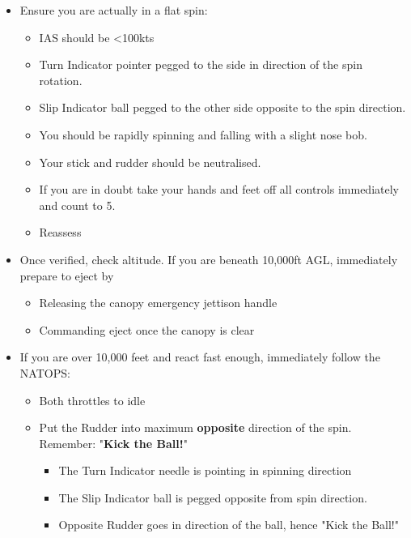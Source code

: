 \begin{itemize}

  \item Ensure you are actually in a flat spin:

  \begin{itemize}
    \item IAS should be <100kts
    \item Turn Indicator pointer pegged to the side in direction of the spin
      rotation.
    \item Slip Indicator ball pegged to the other side opposite to the spin
      direction.
    \item You should be rapidly spinning and falling with a slight nose bob.
    \item Your stick and rudder should be neutralised.
    \item If you are in doubt take your hands and feet off all controls
      immediately and count to 5.
    \item Reassess
  \end{itemize}

  \item Once verified, check altitude. If you are beneath 10,000ft AGL,
    immediately prepare to eject by

  \begin{itemize}
    \item Releasing the canopy emergency jettison handle
    \item Commanding eject once the canopy is clear
  \end{itemize}

  \item If you are over 10,000 feet and react fast enough, immediately follow
    the NATOPS:

  \begin{itemize}

    \item Both throttles to idle

    \item Put the Rudder into maximum \textbf{opposite} direction of the spin.
      Remember: "\textbf{Kick the Ball!}"

      \begin{itemize}
        \item The Turn Indicator needle is pointing in spinning direction
        \item The Slip Indicator ball is pegged opposite from spin direction.
        \item Opposite Rudder goes in direction of the ball, hence "Kick the
        Ball!"
      \end{itemize}


\end{itemize}
\end{itemize}
